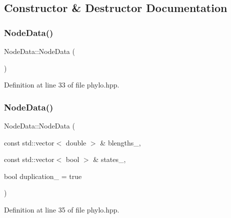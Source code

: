 \subsection{Constructor \& Destructor Documentation}
\mbox{\label{class_node_data_a56da12a9de7c80c25a905012749c8671}} 
\subsubsection{\texorpdfstring{Node\+Data()}{NodeData()}\hspace{0.1cm}{\footnotesize\ttfamily [1/2]}}
{\footnotesize\ttfamily Node\+Data\+::\+Node\+Data (\begin{DoxyParamCaption}{ }\end{DoxyParamCaption})\hspace{0.3cm}{\ttfamily [inline]}}



Definition at line 33 of file phylo.\+hpp.

\mbox{\label{class_node_data_a0a90191ba4c987afa3406f829967d8e2}} 
\subsubsection{\texorpdfstring{Node\+Data()}{NodeData()}\hspace{0.1cm}{\footnotesize\ttfamily [2/2]}}
{\footnotesize\ttfamily Node\+Data\+::\+Node\+Data (\begin{DoxyParamCaption}\item[{const std\+::vector$<$ double $>$ \&}]{blengths\+\_\+,  }\item[{const std\+::vector$<$ bool $>$ \&}]{states\+\_\+,  }\item[{bool}]{duplication\+\_\+ = {\ttfamily true} }\end{DoxyParamCaption})\hspace{0.3cm}{\ttfamily [inline]}}



Definition at line 35 of file phylo.\+hpp.

\mbox{\label{class_node_data_ad870d466c40b9be96ad79adccab79038}} 
